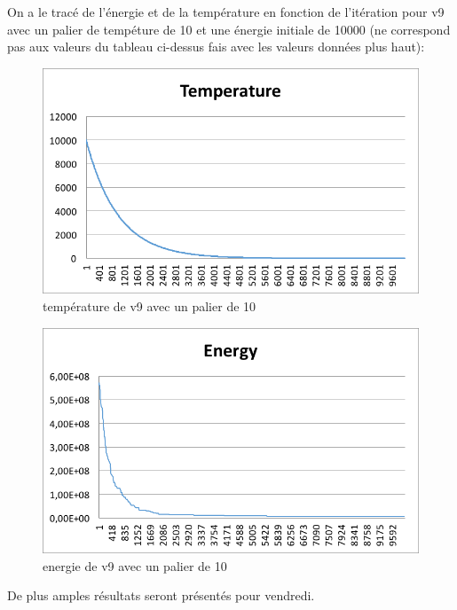 \documentclass[a4paper, 11pt]{article} %
\begin{document}
On a le tracé de l'énergie et de la température en fonction de l'itération pour v9 avec un palier de tempéture de 10 et une énergie initiale de 10000 (ne correspond pas aux valeurs du tableau ci-dessus fais avec les valeurs données plus haut):
\begin{center}

\begin{figure}
\caption{température de v9 avec un palier de 10}
\includegraphics{v9-p10-it10000-temp.png}
\end{figure}

\begin{figure}
\caption{energie de v9 avec un palier de 10}
\includegraphics{v9-p10-it10000-energy.png}
\end{figure}

\end{center}

De plus amples résultats seront présentés pour vendredi.
\end{document}
